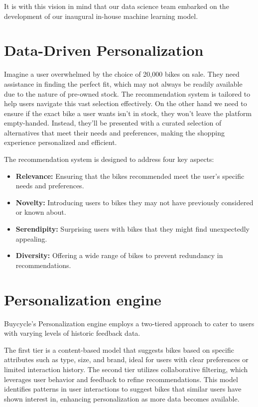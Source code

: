 \documentclass{article}
\begin{document}
It is with this vision in mind that our data science team embarked on the development of our inaugural in-house machine learning model.

\section*{Data-Driven Personalization}
Imagine a user overwhelmed by the choice of 20,000 bikes on sale. They need assistance in finding the perfect fit, which may not always be readily available due to the nature of pre-owned stock. The recommendation system is tailored to help users navigate this vast selection effectively. On the other hand we need to ensure if the exact bike a user wants isn't in stock, they won't leave the platform empty-handed. Instead, they'll be presented with a curated selection of alternatives that meet their needs and preferences, making the shopping experience personalized and efficient.

The recommendation system is designed to address four key aspects:
\begin{itemize}
    \item \textbf{Relevance:} Ensuring that the bikes recommended meet the user's specific needs and preferences.
    \item \textbf{Novelty:} Introducing users to bikes they may not have previously considered or known about.
    \item \textbf{Serendipity:} Surprising users with bikes that they might find unexpectedly appealing.
    \item \textbf{Diversity:} Offering a wide range of bikes to prevent redundancy in recommendations.
\end{itemize}

\section*{Personalization engine}
Buycycle's Personalization engine employs a two-tiered approach to cater to users with varying levels of historic feedback data.

The first tier is a content-based model that suggests bikes based on specific attributes such as type, size, and brand, ideal for users with clear preferences or limited interaction history.
The second tier utilizes collaborative filtering, which leverages user behavior and feedback to refine recommendations. This model identifies patterns in user interactions to suggest bikes that similar users have shown interest in, enhancing personalization as more data becomes available.
\end{document}
